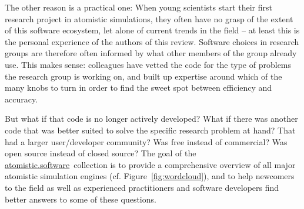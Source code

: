 \documentclass[9pt,review]{livecoms}
\newcommand{\atsoft}{\href{https://atomistic.software}{atomistic.software}\ }
\begin{document}

The other reason is a practical one: 
When young scientists start their first research project in atomistic simulations, they often have no grasp of the extent of this software ecosystem, let alone of current trends in the field -- at least this is the personal experience of the authors of this review.
Software choices in research groups are therefore often informed by what other members of the group already use.
This makes sense: colleagues have vetted the code for the type of problems the research group is working on, and built up expertise around which of the many knobs to turn in order to find the sweet spot between efficiency and accuracy.

But what if that code is no longer actively developed?
What if there was another code that was better suited to solve the specific research problem at hand? 
That had a larger user/developer community? 
Was free instead of commercial? 
Was open source instead of closed source? 
The goal of the \atsoft collection is to provide a comprehensive overview of all major atomistic simulation engines (cf. Figure~\ref{fig:wordcloud}), and to help newcomers to the field as well as experienced practitioners and software developers find better answers to some of these questions.

\end{document}
